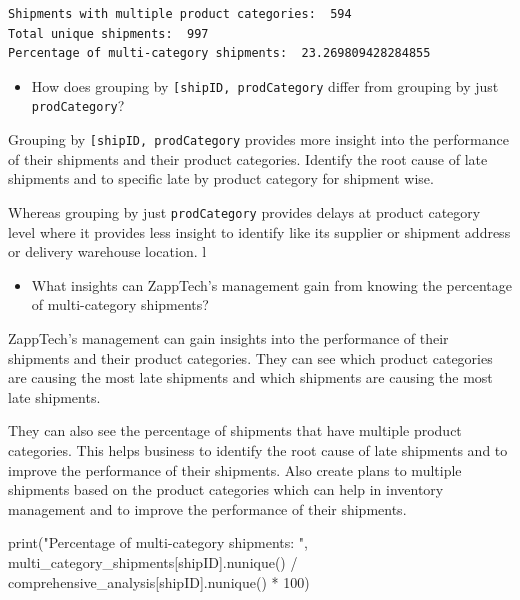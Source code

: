 \documentclass[
]{article}
\newenvironment{Shaded}{\begin{snugshade}}{\end{snugshade}}
\newcommand{\BuiltInTok}[1]{\textcolor[rgb]{0.00,0.23,0.31}{#1}}
\newcommand{\DecValTok}[1]{\textcolor[rgb]{0.68,0.00,0.00}{#1}}
\newcommand{\NormalTok}[1]{\textcolor[rgb]{0.00,0.23,0.31}{#1}}
\newcommand{\OperatorTok}[1]{\textcolor[rgb]{0.37,0.37,0.37}{#1}}
\newcommand{\StringTok}[1]{\textcolor[rgb]{0.13,0.47,0.30}{#1}}
\providecommand{\tightlist}{%
  \setlength{\itemsep}{0pt}\setlength{\parskip}{0pt}}
\begin{document}
\begin{verbatim}
Shipments with multiple product categories:  594
Total unique shipments:  997
Percentage of multi-category shipments:  23.269809428284855
\end{verbatim}

\begin{itemize}
\tightlist
\item
  How does grouping by
  \texttt{{[}\textquotesingle{}shipID\textquotesingle{},\ \textquotesingle{}prodCategory\textquotesingle{}{]}}
  differ from grouping by just
  \texttt{\textquotesingle{}prodCategory\textquotesingle{}}?
\end{itemize}

Grouping by
\texttt{{[}\textquotesingle{}shipID\textquotesingle{},\ \textquotesingle{}prodCategory\textquotesingle{}{]}}
provides more insight into the performance of their shipments and their
product categories. Identify the root cause of late shipments and to
specific late by product category for shipment wise.

Whereas grouping by just
\texttt{\textquotesingle{}prodCategory\textquotesingle{}} provides
delays at product category level where it provides less insight to
identify like its supplier or shipment address or delivery warehouse
location. l

\begin{itemize}
\tightlist
\item
  What insights can ZappTech's management gain from knowing the
  percentage of multi-category shipments?
\end{itemize}

ZappTech's management can gain insights into the performance of their
shipments and their product categories. They can see which product
categories are causing the most late shipments and which shipments are
causing the most late shipments.

They can also see the percentage of shipments that have multiple product
categories. This helps business to identify the root cause of late
shipments and to improve the performance of their shipments. Also create
plans to multiple shipments based on the product categories which can
help in inventory management and to improve the performance of their
shipments.

\label{business-question-analysis-3}
\begin{Shaded}
\begin{Highlighting}[]
\BuiltInTok{print}\NormalTok{(}\StringTok{"Percentage of multi{-}category shipments: "}\NormalTok{, multi\_category\_shipments[}\StringTok{\textquotesingle{}shipID\textquotesingle{}}\NormalTok{].nunique() }\OperatorTok{/}\NormalTok{ comprehensive\_analysis[}\StringTok{\textquotesingle{}shipID\textquotesingle{}}\NormalTok{].nunique() }\OperatorTok{*} \DecValTok{100}\NormalTok{)}
\end{Highlighting}
\end{Shaded}
\end{document}
